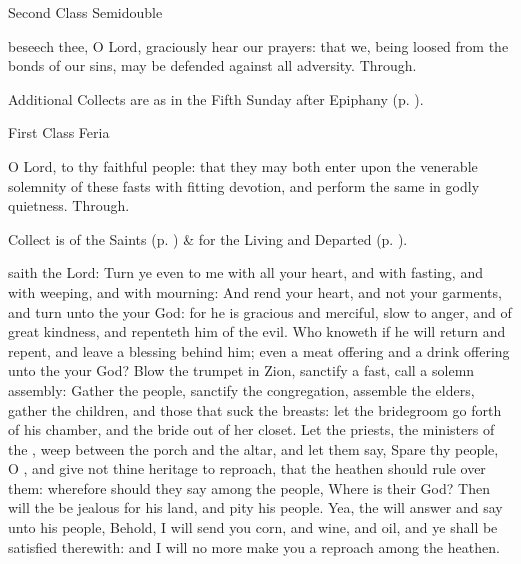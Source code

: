 \begin{inhead}
{Second Class Semidouble}
\end{inhead}

\collect
{} beseech thee, O Lord, graciously hear our prayers: that we, being loosed from the bonds of our sins, may be defended against all adversity. Through.
\begin{rubric}
    Additional Collects are as in the Fifth Sunday after Epiphany (p. \pageref{EpiphanyV}).
\end{rubric}


\begin{inhead}
{First Class Feria}
\end{inhead}

\collect
{} O Lord, to thy faithful people: that they may both enter upon the venerable solemnity of these fasts with fitting devotion, and perform the same in godly quietness. Through.
\begin{rubric}
     Collect is of the Saints (p. \pageref{SPSaints}) \&  for the Living and Departed (p. \pageref{SPLivingDeparted}).
\end{rubric}

 saith the Lord: Turn ye even to me with all your heart, and with fasting, and with weeping, and with mourning: And rend your heart, and not your garments, and turn unto the  your God: for he is gracious and merciful, slow to anger, and of great kindness, and repenteth him of the evil. Who knoweth if he will return and repent, and leave a blessing behind him; even a meat offering and a drink offering unto the  your God? Blow the trumpet in Zion, sanctify a fast, call a solemn assembly: Gather the people, sanctify the congregation, assemble the elders, gather the children, and those that suck the breasts: let the bridegroom go forth of his chamber, and the bride out of her closet. Let the priests, the ministers of the , weep between the porch and the altar, and let them say, Spare thy people, O , and give not thine heritage to reproach, that the heathen should rule over them: wherefore should they say among the people, Where is their God? Then will the  be jealous for his land, and pity his people. Yea, the  will answer and say unto his people, Behold, I will send you corn, and wine, and oil, and ye shall be satisfied therewith: and I will no more make you a reproach among the heathen.


